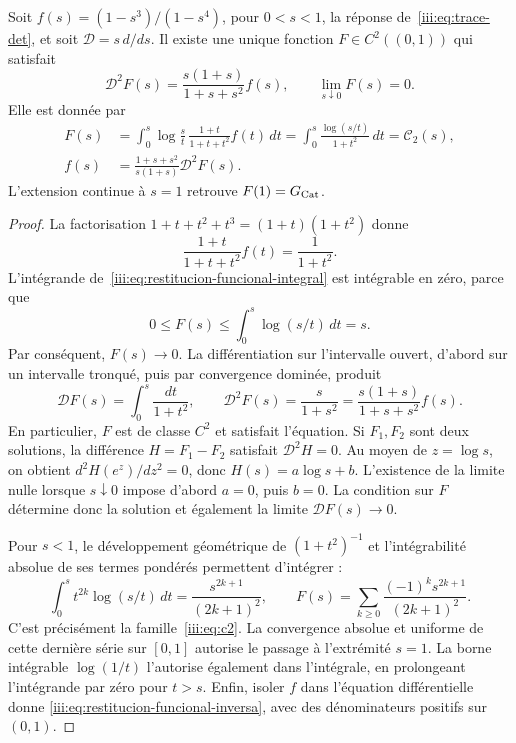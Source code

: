 \begin{theorem}
\label{iii:thm:restitucion-funcional-catalan}
Soit $f(s)=(1-s^3)/(1-s^4)$, pour $0<s<1$, la réponse
de~\eqref{iii:eq:trace-det}, et soit $\mathcal D=s\,d/ds$.
Il existe une unique fonction $F\in C^2((0,1))$ qui satisfait
\begin{equation}
 \mathcal D^2F(s)=\frac{s(1+s)}{1+s+s^2}f(s),
 \qquad \lim_{s\downarrow0}F(s)=0.
 \label{iii:eq:restitucion-funcional-problema}
\end{equation}
Elle est donnée par
\begin{align}
 F(s)&=\int_0^s\log\frac{s}{t}\,
          \frac{1+t}{1+t+t^2}f(t)\,dt
       =\int_0^s\frac{\log(s/t)}{1+t^2}\,dt
       =\mathcal C_2(s),
 \label{iii:eq:restitucion-funcional-integral}\\
 f(s)&=\frac{1+s+s^2}{s(1+s)}\mathcal D^2F(s).
 \label{iii:eq:restitucion-funcional-inversa}
\end{align}
L’extension continue à $s=1$ retrouve $F(1)=G_{\rm Cat}$.
\end{theorem}
\begin{proof}
La factorisation $1+t+t^2+t^3=(1+t)(1+t^2)$ donne
\[
 \frac{1+t}{1+t+t^2}f(t)=\frac1{1+t^2}.
\]
L’intégrande de~\eqref{iii:eq:restitucion-funcional-integral} est
intégrable en zéro, parce que
\[
 0\leq F(s)\leq\int_0^s\log(s/t)\,dt=s.
\]
Par conséquent, $F(s)\to0$. La différentiation sur l’intervalle ouvert,
d’abord sur un intervalle tronqué, puis par convergence dominée,
produit
\[
 \mathcal DF(s)=\int_0^s\frac{dt}{1+t^2},
 \qquad \mathcal D^2F(s)=\frac{s}{1+s^2}
     =\frac{s(1+s)}{1+s+s^2}f(s).
\]
En particulier, $F$ est de classe $C^2$ et satisfait l’équation.
Si $F_1,F_2$ sont deux solutions, la différence $H=F_1-F_2$
satisfait $\mathcal D^2H=0$. Au moyen de $z=\log s$, on obtient
$d^2H(e^z)/dz^2=0$, donc $H(s)=a\log s+b$.
L’existence de la limite nulle lorsque $s\downarrow0$ impose d’abord
$a=0$, puis $b=0$. La condition sur $F$ détermine donc
la solution et également la limite $\mathcal DF(s)\to0$.

Pour $s<1$, le développement géométrique de $(1+t^2)^{-1}$ et
l’intégrabilité absolue de ses termes pondérés permettent d’intégrer :
\[
 \int_0^s t^{2k}\log(s/t)\,dt
     =\frac{s^{2k+1}}{(2k+1)^2},\qquad
 F(s)=\sum_{k\geq0}\frac{(-1)^ks^{2k+1}}{(2k+1)^2}.
\]
C’est précisément la famille~\eqref{iii:eq:c2}. La convergence
absolue et uniforme de cette dernière série sur $[0,1]$ autorise le
passage à l’extrémité $s=1$. La borne
intégrable $\log(1/t)$ l’autorise également dans l’intégrale, en prolongeant l’intégrande par zéro pour
$t>s$. Enfin, isoler $f$ dans l’équation différentielle donne
\eqref{iii:eq:restitucion-funcional-inversa}, avec des dénominateurs
positifs sur $(0,1)$.
\end{proof}

